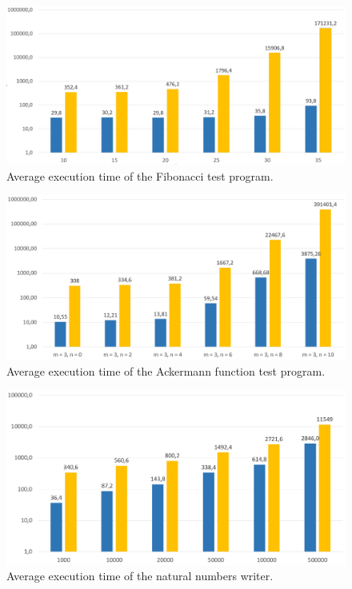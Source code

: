 \documentclass[declaration,shortabstract,english,mgr]{iithesis}
\begin{document}
\begin{figure}
	\includegraphics[width=1\textwidth]{fibonacci_chart.png}
    \centering
    \caption{Average execution time of the Fibonacci test program.}
    \label{fig:fibonacci_chart}
\end{figure}

\begin{figure}
	\includegraphics[width=1\textwidth]{ackermann_chart.png}
    \centering
    \caption{Average execution time of the Ackermann function test program.}
    \label{fig:ackermann_chart}
\end{figure}

\begin{figure}
	\includegraphics[width=1\textwidth]{natural_chart.png}
    \centering
    \caption{Average execution time of the natural numbers writer.}
    \label{fig:natural_chart}
\end{figure}
\end{document}

